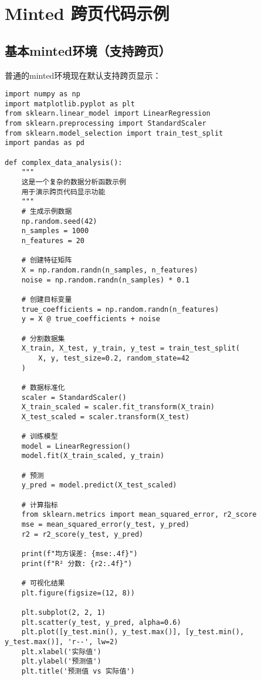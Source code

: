 \section{Minted 跨页代码示例}

\subsection{基本minted环境（支持跨页）}

普通的minted环境现在默认支持跨页显示：

\begin{verbatim}
import numpy as np
import matplotlib.pyplot as plt
from sklearn.linear_model import LinearRegression
from sklearn.preprocessing import StandardScaler
from sklearn.model_selection import train_test_split
import pandas as pd

def complex_data_analysis():
    """
    这是一个复杂的数据分析函数示例
    用于演示跨页代码显示功能
    """
    # 生成示例数据
    np.random.seed(42)
    n_samples = 1000
    n_features = 20
    
    # 创建特征矩阵
    X = np.random.randn(n_samples, n_features)
    noise = np.random.randn(n_samples) * 0.1
    
    # 创建目标变量
    true_coefficients = np.random.randn(n_features)
    y = X @ true_coefficients + noise
    
    # 分割数据集
    X_train, X_test, y_train, y_test = train_test_split(
        X, y, test_size=0.2, random_state=42
    )
    
    # 数据标准化
    scaler = StandardScaler()
    X_train_scaled = scaler.fit_transform(X_train)
    X_test_scaled = scaler.transform(X_test)
    
    # 训练模型
    model = LinearRegression()
    model.fit(X_train_scaled, y_train)
    
    # 预测
    y_pred = model.predict(X_test_scaled)
    
    # 计算指标
    from sklearn.metrics import mean_squared_error, r2_score
    mse = mean_squared_error(y_test, y_pred)
    r2 = r2_score(y_test, y_pred)
    
    print(f"均方误差: {mse:.4f}")
    print(f"R² 分数: {r2:.4f}")
    
    # 可视化结果
    plt.figure(figsize=(12, 8))
    
    plt.subplot(2, 2, 1)
    plt.scatter(y_test, y_pred, alpha=0.6)
    plt.plot([y_test.min(), y_test.max()], [y_test.min(), y_test.max()], 'r--', lw=2)
    plt.xlabel('实际值')
    plt.ylabel('预测值')
    plt.title('预测值 vs 实际值')
    

\end{verbatim}
